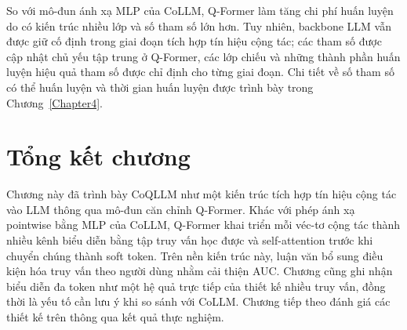 So với mô-đun ánh xạ MLP của CoLLM, Q-Former làm tăng chi phí huấn luyện do có kiến trúc nhiều
lớp và số tham số lớn hơn. Tuy nhiên, backbone LLM vẫn được giữ cố định trong giai đoạn tích hợp
tín hiệu cộng tác; các tham số được cập nhật chủ yếu tập trung ở Q-Former, các lớp chiếu và
những thành phần huấn luyện hiệu quả tham số được chỉ định cho từng giai đoạn. Chi tiết về số
tham số có thể huấn luyện và thời gian huấn luyện được trình bày trong Chương~\ref{Chapter4}.

\section{Tổng kết chương}
\label{sec:ket-chuong-3}

Chương này đã trình bày CoQLLM như một kiến trúc tích hợp tín hiệu cộng tác vào LLM thông qua
mô-đun căn chỉnh Q-Former. Khác với phép ánh xạ pointwise bằng MLP của CoLLM, Q-Former khai triển mỗi
véc-tơ cộng tác thành nhiều kênh biểu diễn bằng tập truy vấn học được và self-attention trước
khi chuyển chúng thành soft token. Trên nền kiến trúc này, luận văn bổ sung điều kiện hóa truy
vấn theo người dùng nhằm cải thiện AUC. Chương cũng ghi nhận biểu diễn đa token như một hệ quả
trực tiếp của thiết kế nhiều truy vấn, đồng thời là yếu tố cần lưu ý khi so sánh với CoLLM.
Chương tiếp theo đánh giá các thiết kế trên thông qua kết quả thực nghiệm.
